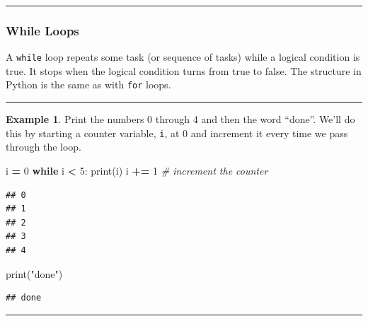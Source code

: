 \documentclass[
]{book}
\newenvironment{Shaded}{\begin{snugshade}}{\end{snugshade}}
\newcommand{\BuiltInTok}[1]{#1}
\newcommand{\CommentTok}[1]{\textcolor[rgb]{0.56,0.35,0.01}{\textit{#1}}}
\newcommand{\ControlFlowTok}[1]{\textcolor[rgb]{0.13,0.29,0.53}{\textbf{#1}}}
\newcommand{\DecValTok}[1]{\textcolor[rgb]{0.00,0.00,0.81}{#1}}
\newcommand{\NormalTok}[1]{#1}
\newcommand{\OperatorTok}[1]{\textcolor[rgb]{0.81,0.36,0.00}{\textbf{#1}}}
\newcommand{\StringTok}[1]{\textcolor[rgb]{0.31,0.60,0.02}{#1}}
\theoremstyle{definition}
\theoremstyle{definition}
\newtheorem{example}{Example}[chapter]
\theoremstyle{definition}
\theoremstyle{remark}
\begin{document}
\begin{center}\rule{0.5\linewidth}{0.5pt}\end{center}

\hypertarget{while-loops}{%
\subsubsection{While Loops}\label{while-loops}}

A \texttt{while} loop repeats some task (or sequence of tasks) while a logical condition is true. It stops when the logical condition turns from true to false. The structure in Python is the same as with \texttt{for} loops.

\begin{center}\rule{0.5\linewidth}{0.5pt}\end{center}

\begin{example}
\protect\hypertarget{exm:unnamed-chunk-667}{}{\label{exm:unnamed-chunk-667} }Print the numbers 0 through 4 and then the word ``done''. We'll do this by starting a counter variable, \texttt{i}, at 0 and increment it every time we pass through the loop.
\end{example}

\begin{Shaded}
\begin{Highlighting}[]
\NormalTok{i }\OperatorTok{=} \DecValTok{0}
\ControlFlowTok{while}\NormalTok{ i }\OperatorTok{\textless{}} \DecValTok{5}\NormalTok{:}
    \BuiltInTok{print}\NormalTok{(i)}
\NormalTok{    i }\OperatorTok{+=} \DecValTok{1} \CommentTok{\# increment the counter}
\end{Highlighting}
\end{Shaded}

\begin{verbatim}
## 0
## 1
## 2
## 3
## 4
\end{verbatim}

\begin{Shaded}
\begin{Highlighting}[]
\BuiltInTok{print}\NormalTok{(}\StringTok{"done"}\NormalTok{)}
\end{Highlighting}
\end{Shaded}

\begin{verbatim}
## done
\end{verbatim}

\begin{center}\rule{0.5\linewidth}{0.5pt}\end{center}
\end{document}
